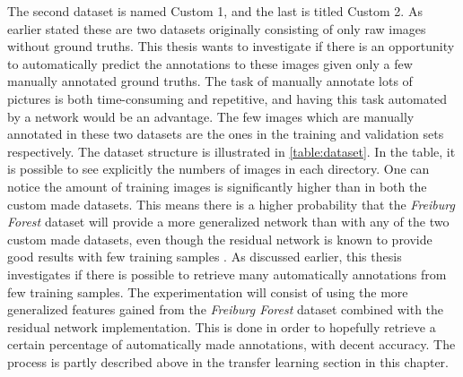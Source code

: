 \documentclass[USenglish]{ifimaster}  %
\begin{document}
The second dataset is named Custom 1, and the last is titled Custom 2. As earlier stated these are two datasets originally consisting of only raw images without ground truths. This thesis wants to investigate if there is an opportunity to automatically predict the annotations to these images given only a few manually annotated ground truths. The task of manually annotate lots of pictures is both time-consuming and repetitive, and having this task automated by a network would be an advantage. The few images which are manually annotated in these two datasets are the ones in the training and validation sets respectively. The dataset structure is illustrated in \cref{table:dataset}. In the table, it is possible to see explicitly the numbers of images in each directory. One can notice the amount of training images is significantly higher than in both the custom made datasets. This means there is a higher probability that the \textit{Freiburg Forest} dataset will provide a more generalized network than with any of the two custom made datasets, even though the residual network is known to provide good results with few training samples \cite{website:u_net_article}. As discussed earlier, this thesis investigates if there is possible to retrieve many automatically annotations from few training samples. The experimentation will consist of using the more generalized features gained from the \textit{Freiburg Forest} dataset combined with the residual network implementation. This is done in order to hopefully retrieve a certain percentage of automatically made annotations, with decent accuracy. The process is partly described above in the transfer learning section in this chapter.
\end{document}
